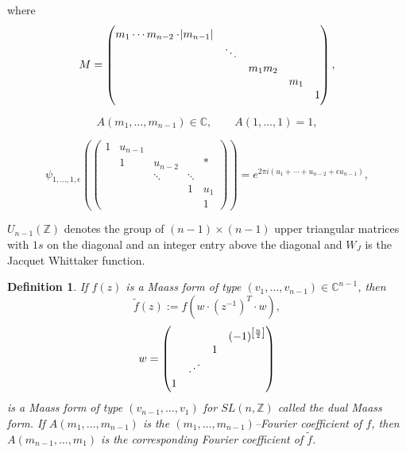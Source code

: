 \documentclass[sn-mathphys,Numbered]{sn-jnl}
\theoremstyle{thmstyleone}%
\theoremstyle{thmstyletwo}%
\theoremstyle{thmstylethree}%
\newtheorem{definition}{Definition}%
\begin{document}
\noindent
where 
$$ M = 
\begin{pmatrix} 
 m_1\cdots m_{n-2} \cdot \abs{m_{n-1}} &           &             &        & \\
                                                        & \ddots &              &        & \\ 
                                                        &           & m_1m_2 &        & \\ 
                                                        &           &             & m_1 & \\ 
                                                        &           &             &        & 1 
\end{pmatrix} ,
$$

$$ A(m_1,\dots,m_{n-1}) \in \mathbb{C} , \qquad  A(1,\dots,1)=1,$$

$$ \psi_{1,\dots,1,\epsilon} \left( 
\begin{pmatrix}
1 & u_{n-1} &             &            &   \\
  & 1          & u_{n-2}  &            & * \\
  &            & \ddots     & \ddots  &     \\
  &            &              & 1          & u_1 \\
  &            &              &             & 1        
\end{pmatrix}
\right) = e^{2 \pi i (u_1+\cdots +u_{n-2}+\epsilon u_{n-1})},$$

\noindent
$U_{n-1}(\mathbb{Z})$ denotes the group of $(n-1) \times (n-1)$ upper triangular matrices with $1s$ on the diagonal and an integer entry above the diagonal and $W_J$ is the Jacquet Whittaker function. \\

\begin{definition}
If $f(z)$ is a Maass form of type $(v_1,\dots,v_{n-1}) \in \mathbb{C}^{n-1}$, then
$$ \tilde{f}(z) := f(w \cdot (z^{-1})^T \cdot w), $$
$$ w = \begin{pmatrix} 
&&& (-1)^{ \left[ \frac{n}{2} \right]} \\
&& 1 & \\
& \reflectbox{$\ddots$} && \\
1&&& 
 \end{pmatrix} $$
is a Maass form of type $(v_{n-1},\dots,v_1)$ for $SL(n,\mathbb{Z})$ called the dual Maass form. If $A(m_1, \dots, m_{n-1})$ is the $(m_1, \dots, m_{n-1})$--Fourier coefficient of $f$, then $A(m_{n-1} , \dots, m_1)$ is the corresponding Fourier coefficient of $\tilde{f}$. \\
\end{definition}
\end{document}
